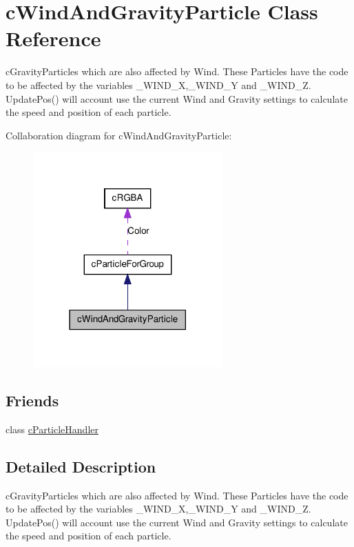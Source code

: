 \hypertarget{classc_wind_and_gravity_particle}{
\section{cWindAndGravityParticle Class Reference}
\label{classc_wind_and_gravity_particle}
}


cGravityParticles which are also affected by Wind. These Particles have the code to be affected by the variables \_\-WIND\_\-X,\_\-WIND\_\-Y and \_\-WIND\_\-Z. UpdatePos() will account use the current Wind and Gravity settings to calculate the speed and position of each particle.  




Collaboration diagram for cWindAndGravityParticle:\nopagebreak
\begin{figure}[H]
\begin{center}
\leavevmode
\includegraphics[width=206pt]{classc_wind_and_gravity_particle__coll__graph}
\end{center}
\end{figure}
\subsection*{Friends}
\begin{DoxyCompactItemize}
\item 
\hypertarget{classc_wind_and_gravity_particle_ad810bc5f0330a0154ffaabe8d256379c}{
class \hyperlink{classc_wind_and_gravity_particle_ad810bc5f0330a0154ffaabe8d256379c}{cParticleHandler}}
\label{classc_wind_and_gravity_particle_ad810bc5f0330a0154ffaabe8d256379c}

\end{DoxyCompactItemize}


\subsection{Detailed Description}
cGravityParticles which are also affected by Wind. These Particles have the code to be affected by the variables \_\-WIND\_\-X,\_\-WIND\_\-Y and \_\-WIND\_\-Z. UpdatePos() will account use the current Wind and Gravity settings to calculate the speed and position of each particle. 